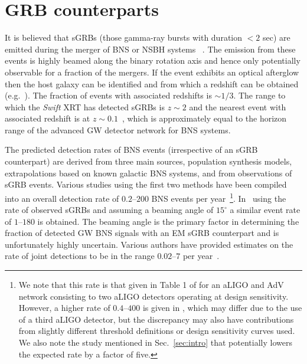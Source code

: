 \documentclass[prd, twocolumn, lengthcheck, superscriptaddress, showpacs, letterpaper, nofootinbib]{revtex4-1}
\begin{document}
\section{GRB counterparts\label{sec:GRB}}

It is believed that \acp{sGRB} (those gamma-ray bursts with duration ${<}2$ sec) are
emitted during the merger of
\ac{BNS} or \ac{NSBH} systems ~\cite{1989Natur.340..126E,1992ApJ...395L..83N}. The emission
from these events is highly beamed along the binary rotation axis and hence
only potentially observable for a fraction of the mergers. If the event
exhibits an optical afterglow then the host galaxy can be identified and from which
a redshift can be obtained (e.g.~\cite{2005Natur.437..851G}).  The fraction of events with 
associated redshifts is ${\sim}1/3$. The range to which the \emph{Swift} \ac{XRT} has detected
\acp{sGRB} is $z{\sim}2$ and the nearest event with associated redshift is at
$z{\sim}0.1$~\cite{2015GCN..17278...1C}, which is approximately equal to the
horizon range of the advanced \ac{GW} detector network for \ac{BNS} systems. 

The predicted detection rates of \ac{BNS} events (irrespective of an \ac{sGRB}
counterpart) are derived from three main sources, population synthesis models,
extrapolations based on known galactic \ac{BNS} systems, and from observations
of \ac{sGRB} events. Various studies using the first two methods have been
compiled into an overall detection rate of $0.2$--$200$ \ac{BNS} events per
year~\cite{2013arXiv1304.0670L,2010CQGra..27q3001A}\footnote{We note that this
rate is that given in Table 1 of \cite{2013arXiv1304.0670L} for an \ac{aLIGO}
and \ac{AdV} network consisting to two \ac{aLIGO} detectors operating at design
sensitivity. However, a higher rate of $0.4$--$400$ is given in
\cite{2010CQGra..27q3001A}, which may differ due to the use of a third
\ac{aLIGO} detector, but the discrepancy may also have contributions from
slightly different threshold definitions or design sensitivity curves used. We
also note the study mentioned in Sec.~\ref{sec:intro} that potentially lowers
the expected rate by a factor of five.}.  In~\cite{2012MNRAS.425.2668C} using
the rate of observed \acp{sGRB} and assuming a beaming angle of $15^{\circ}$ a
similar event rate of $1$--$180$ is obtained. The beaming angle is the primary
factor in determining the fraction of detected \ac{GW} \ac{BNS} signals with an
\ac{EM} \ac{sGRB} counterpart and is unfortunately highly uncertain.  Various
authors have provided estimates on the rate of joint detections to be in the
range $0.02$--$7$ per
year~\cite{2013PhRvL.111r1101C,Kelley:2012fl,2014arXiv1405.2254S,2015MNRAS.448.3026W}.  
\end{document}
